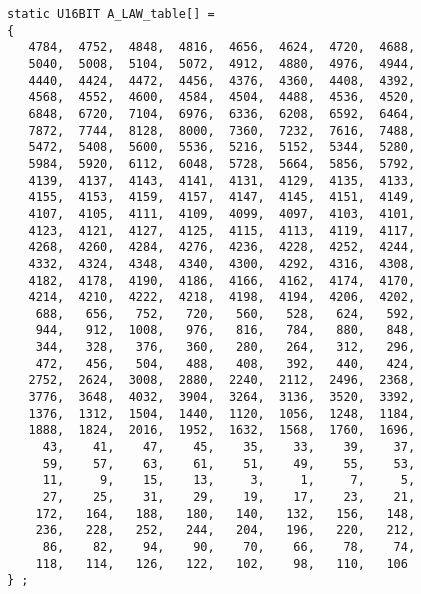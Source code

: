 \begin{verbatim}
static U16BIT A_LAW_table[] =
{
   4784,  4752,  4848,  4816,  4656,  4624,  4720,  4688, 
   5040,  5008,  5104,  5072,  4912,  4880,  4976,  4944, 
   4440,  4424,  4472,  4456,  4376,  4360,  4408,  4392, 
   4568,  4552,  4600,  4584,  4504,  4488,  4536,  4520, 
   6848,  6720,  7104,  6976,  6336,  6208,  6592,  6464, 
   7872,  7744,  8128,  8000,  7360,  7232,  7616,  7488, 
   5472,  5408,  5600,  5536,  5216,  5152,  5344,  5280, 
   5984,  5920,  6112,  6048,  5728,  5664,  5856,  5792, 
   4139,  4137,  4143,  4141,  4131,  4129,  4135,  4133, 
   4155,  4153,  4159,  4157,  4147,  4145,  4151,  4149, 
   4107,  4105,  4111,  4109,  4099,  4097,  4103,  4101, 
   4123,  4121,  4127,  4125,  4115,  4113,  4119,  4117, 
   4268,  4260,  4284,  4276,  4236,  4228,  4252,  4244, 
   4332,  4324,  4348,  4340,  4300,  4292,  4316,  4308, 
   4182,  4178,  4190,  4186,  4166,  4162,  4174,  4170, 
   4214,  4210,  4222,  4218,  4198,  4194,  4206,  4202, 
    688,   656,   752,   720,   560,   528,   624,   592, 
    944,   912,  1008,   976,   816,   784,   880,   848, 
    344,   328,   376,   360,   280,   264,   312,   296, 
    472,   456,   504,   488,   408,   392,   440,   424, 
   2752,  2624,  3008,  2880,  2240,  2112,  2496,  2368, 
   3776,  3648,  4032,  3904,  3264,  3136,  3520,  3392, 
   1376,  1312,  1504,  1440,  1120,  1056,  1248,  1184, 
   1888,  1824,  2016,  1952,  1632,  1568,  1760,  1696, 
     43,    41,    47,    45,    35,    33,    39,    37, 
     59,    57,    63,    61,    51,    49,    55,    53, 
     11,     9,    15,    13,     3,     1,     7,     5, 
     27,    25,    31,    29,    19,    17,    23,    21, 
    172,   164,   188,   180,   140,   132,   156,   148, 
    236,   228,   252,   244,   204,   196,   220,   212, 
     86,    82,    94,    90,    70,    66,    78,    74, 
    118,   114,   126,   122,   102,    98,   110,   106
} ;


\end{verbatim}
